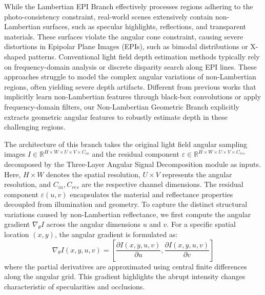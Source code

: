 While the Lambertian EPI Branch effectively processes regions adhering to the photo-consistency constraint, real-world scenes extensively contain non-Lambertian surfaces, such as specular highlights, reflections, and transparent materials. These surfaces violate the angular cone constraint, causing severe distortions in Epipolar Plane Images (EPIs), such as bimodal distributions or X-shaped patterns. Conventional light field depth estimation methods typically rely on frequency-domain analysis or discrete disparity search along EPI lines. These approaches struggle to model the complex angular variations of non-Lambertian regions, often yielding severe depth artifacts. Different from previous works that implicitly learn non-Lambertian features through black-box convolutions or apply frequency-domain filters, our Non-Lambertian Geometric Branch explicitly extracts geometric angular features to robustly estimate depth in these challenging regions.

The architecture of this branch takes the original light field angular sampling images $I \in \mathbb{R}^{H \times W \times U \times V \times C_{in}}$ and the residual component $\varepsilon \in \mathbb{R}^{H \times W \times U \times V \times C_{res}}$ decomposed by the Three-Layer Angular Signal Decomposition module as inputs. Here, $H \times W$ denotes the spatial resolution, $U \times V$ represents the angular resolution, and $C_{in}, C_{res}$ are the respective channel dimensions. The residual component $\varepsilon(u,v)$ encapsulates the material and reflectance properties decoupled from illumination and geometry. To capture the distinct structural variations caused by non-Lambertian reflectance, we first compute the angular gradient $\nabla_{\theta} I$ across the angular dimensions $u$ and $v$. For a specific spatial location $(x,y)$, the angular gradient is formulated as:
\begin{equation}
\label{eq:eq12}
\nabla_{\theta} I(x,y,u,v) = \left[ \frac{\partial I(x,y,u,v)}{\partial u}, \frac{\partial I(x,y,u,v)}{\partial v} \right]
\end{equation}
where the partial derivatives are approximated using central finite differences along the angular grid. This gradient highlights the abrupt intensity changes characteristic of specularities and occlusions.

